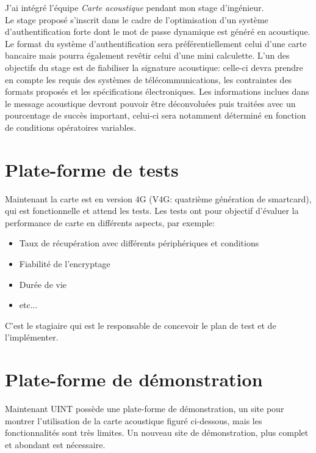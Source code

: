 \label{sujet}
J'ai intégré l'équipe \textit{Carte acoustique} pendant mon stage d'ingénieur.\\

Le stage proposé s’inscrit dans le cadre de l’optimisation d’un système d’authentification forte dont le mot de passe dynamique est généré en acoustique.\\

Le format du système d’authentification sera préférentiellement celui d’une carte bancaire mais pourra également revêtir celui d’une mini calculette. L'un des objectifs du stage est de fiabiliser la signature acoustique: celle-ci devra prendre en compte les requis des systèmes de télécommunications, les contraintes des formats proposés et les spécifications électroniques. Les informations inclues dans le message acoustique devront pouvoir être déconvoluées puis traitées avec un pourcentage de succès important, celui-ci sera notamment déterminé en fonction de conditions opératoires variables.\\

\section{Plate-forme de tests}

Maintenant la carte est en version 4G (V4G: quatrième génération de smartcard), qui est fonctionnelle et attend les tests. Les tests ont pour  objectif d'évaluer la performance de carte en différents aspects, par exemple:\\

\begin{itemize}
\item Taux de récupération avec différents périphériques et conditions
\item Fiabilité de l'encryptage
\item Durée de vie
\item etc...\\
\end{itemize}

C'est le stagiaire qui est le responsable de concevoir le plan de test et de l'implémenter.
\newpage
\section{Plate-forme de démonstration}

Maintenant UINT possède une plate-forme de démonstration, un site pour montrer l'utilisation de la carte acoustique figuré ci-dessous, mais les fonctionnalités sont très limites. Un nouveau site de démonstration, plus complet et abondant est nécessaire.

